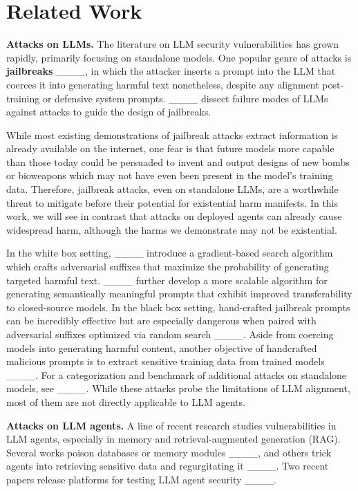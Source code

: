 \section{Related Work}
\label{sec:related}

\textbf{Attacks on LLMs.} The literature on LLM security vulnerabilities has grown rapidly, primarily focusing on standalone models. One popular genre of attacks is \textbf{jailbreaks} ____, in which the attacker inserts a prompt into the LLM that coerces it into generating harmful text nonetheless, despite any alignment post-training or defensive system prompts. ____ dissect failure modes of LLMs against attacks to guide the design of jailbreaks.

While most existing demonstrations of jailbreak attacks extract information is already available on the internet, one fear is that future models more capable than those today could be persuaded to invent and output designs of new bombs or bioweapons which may not have even been present in the model's training data.  Therefore, jailbreak attacks, even on standalone LLMs, are a worthwhile threat to mitigate before their potential for existential harm manifests.  In this work, we will see in contrast that attacks on deployed agents can already cause widespread harm, although the harms we demonstrate may not be existential.

In the white box setting, ____ introduce a gradient-based search algorithm which crafts adversarial suffixes that maximize the probability of generating targeted harmful text. ____ further develop a more scalable algorithm for generating semantically meaningful prompts that exhibit improved transferability to closed-source models. In the black box setting, hand-crafted jailbreak prompts can be incredibly effective but are especially dangerous when paired with adversarial suffixes optimized via random search ____. Aside from coercing models into generating harmful content, another objective of handcrafted malicious prompts is to extract sensitive training data from trained models ____.  For a categorization and benchmark of additional attacks on standalone models, see ____.  While these attacks probe the limitations of LLM alignment, most of them are not directly applicable to LLM agents.
 

\textbf{Attacks on LLM agents.} A line of recent research studies vulnerabilities in LLM agents, especially in memory and retrieval-augmented generation (RAG).  Several works poison databases or memory modules ____, and others trick agents into retrieving sensitive data and regurgitating it ____. Two recent papers release platforms for testing LLM agent security ____. 

